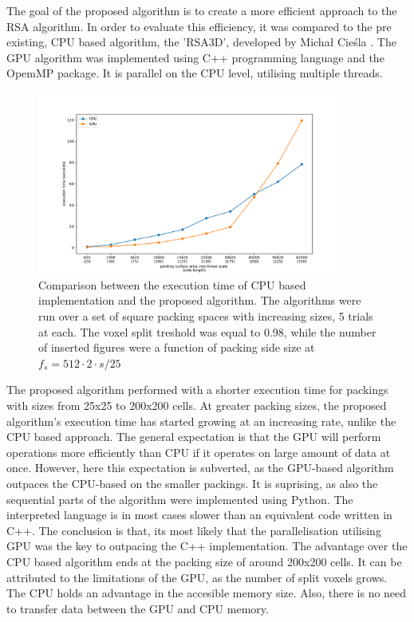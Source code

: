 \documentclass[12pt, oneside]{report}
\begin{document}
The goal of the proposed algorithm is to create a more efficient approach to the RSA algorithm. In order to evaluate this efficiency, it was compared to the pre existing, CPU based algorithm, the 'RSA3D', developed by Michał Cieśla \cite{ciesla}. The GPU algorithm was implemented using C++ programming language and the OpemMP package. It is parallel on the CPU level, utilising multiple threads. \newline

\begin{figure}[H]
  \centering
	\label{summary_comparison}
	\includegraphics[width=0.9\textwidth,keepaspectratio]{Images/SummaryComparison/basic_comparison.pdf}
	\caption{Comparison between the execution time of CPU based implementation and the proposed algorithm. The algorithms were run over a set of square packing spaces with increasing sizes, 5 trials at each. The voxel split treshold was equal to 0.98, while the number of inserted figures were a function of packing side size at $f_s = 512 \cdot 2 \cdot s/25 $ }
\end{figure}

The proposed algorithm performed with a shorter execution time for packings with sizes from 25x25 to 200x200 cells. At greater packing sizes, the proposed algorithm's execution time has started growing at an increasing rate, unlike the CPU based approach. \newline
The general expectation is that the GPU will perform operations more efficiently than CPU if it operates on large amount of data at once. However, here this expectation is subverted, as the GPU-based algorithm outpaces the CPU-based on the smaller packings. It is suprising, as also the sequential parts of the algorithm were implemented using Python. The interpreted language is in most cases slower than an equivalent code written in C++. The conclusion is that, its most likely that the parallelisation utilising GPU was the key to outpacing the C++ implementation.\newline
The advantage over the CPU based algorithm ends at the packing size of around 200x200 cells. It can be attributed to the limitations of the GPU, as the number of split voxels grows. The CPU holds an advantage in the accesible memory size. Also, there is no need to transfer data between the GPU and CPU memory.
\end{document}
